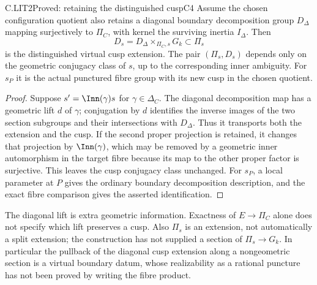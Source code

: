 \begin{claim}{C.LIT2}{Proved: retaining the distinguished cusp}{C4}
Assume the chosen configuration quotient also retains a diagonal
boundary decomposition group $D_\Delta$ mapping surjectively to
$\Pi_C$, with kernel the surviving inertia $I_\Delta$. Then
\[
 D_s=D_\Delta\times_{\Pi_C,s}G_k\subset\Pi_s
\]
is the distinguished virtual cusp extension. The pair $(\Pi_s,D_s)$
depends only on the geometric conjugacy class of $s$, up to the
corresponding inner ambiguity. For $s_P$ it is the actual punctured
fibre group with its new cusp in the chosen quotient.
\end{claim}
\begin{proof}
Suppose $s'=\Inn(\gamma)s$ for $\gamma\in\Delta_C$. The diagonal
decomposition map has a geometric lift $d$ of $\gamma$; conjugation
by $d$ identifies the inverse images of the two section subgroups and
their intersections with $D_\Delta$. Thus it transports both the
extension and the cusp. If the second proper projection is retained,
it changes that projection by $\Inn(\gamma)$, which may be removed
by a geometric inner automorphism in the target fibre because its
map to the other proper factor is surjective. This leaves the cusp
conjugacy class unchanged. For $s_P$, a local parameter at $P$ gives
the ordinary boundary decomposition description, and the exact fibre
comparison gives the asserted identification.
\end{proof}

The diagonal lift is extra geometric information. Exactness of
$E\to\Pi_C$ alone does not specify which lift preserves a cusp.
Also $\Pi_s$ is an extension, not automatically a split extension;
the construction has not supplied a section of $\Pi_s\to G_k$.
In particular the pullback of the diagonal cusp extension along a
nongeometric section is a virtual boundary datum, whose realizability
as a rational puncture has not been proved by writing the fibre product.

